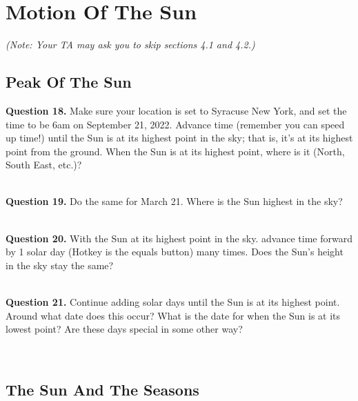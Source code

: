 \documentclass[11pt]{article}
\begin{document}
	
	\newpage
	
	\section{Motion Of The Sun}
	
	{\it (Note: Your TA may ask you to skip sections 4.1 and 4.2.)}
	
	\subsection{Peak Of The Sun}
	
	\textbf{Question 18.} Make sure your location is set to Syracuse New York, and set the time to be 6am on September 21, 2022. Advance time (remember you can speed up time!) until the Sun is at its highest point in the sky; that is, it's at its highest point from the ground. When the Sun is at its highest point, where is it (North, South East, etc.)?\\
	\vspace*{1.5cm}
	
	\hrulefill\\
	
	\textbf{Question 19.} Do the same for March 21. Where is the Sun highest in the sky?\\
	\vspace*{1.5cm}
	
	\hrulefill\\
	
	\textbf{Question 20.} With the Sun at its highest point in the sky. advance time forward by 1 solar day (Hotkey is the equals button) many times. Does the Sun's height in the sky stay the same?\\
	\vspace*{1.5cm}
	
	\hrulefill\\
	
	\textbf{Question 21.} Continue adding solar days until the Sun is at its highest point. Around what date does this occur? What is the date for when the Sun is at its lowest point? Are these days special in some other way?\\
	\vspace*{1.5cm}
	
	\hrulefill\\
	
	\newpage
	
	\subsection{The Sun And The Seasons}
	
\end{document}
